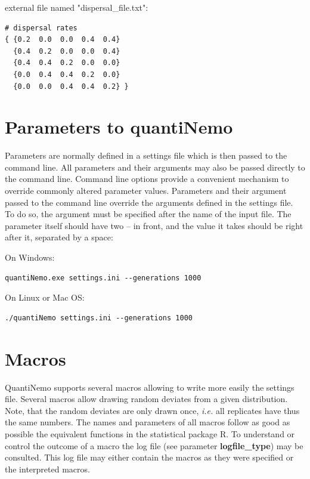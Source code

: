 \documentclass[letterpaper,12pt,oneside]{book}
\begin{document}
external file named "dispersal\_file.txt":
\begin{lstlisting}[frame=single]
# dispersal rates
{ {0.2  0.0  0.0  0.4  0.4}
  {0.4  0.2  0.0  0.0  0.4}
  {0.4  0.4  0.2  0.0  0.0}
  {0.0  0.4  0.4  0.2  0.0}
  {0.0  0.0  0.4  0.4  0.2} }
\end{lstlisting}

\section{Parameters to quantiNemo}\label{paramInput}
Parameters are normally defined in a settings file which is then passed to the command line. All parameters and their arguments may also be passed directly to the command line. Command line options provide a convenient mechanism to override commonly altered parameter values. Parameters and their argument passed to the command line override the arguments defined in the settings file. To do so, the argument must be specified after the name of the input file. The parameter itself should have two -- in front, and the value it takes should be right after it, separated by a space:   

On Windows:
\begin{lstlisting}[frame=single]
quantiNemo.exe settings.ini --generations 1000
\end{lstlisting}

On Linux or Mac OS:
\begin{lstlisting}[frame=single]
./quantiNemo settings.ini --generations 1000
\end{lstlisting}

\section{Macros}\label{macros}
QuantiNemo supports several macros allowing to write more easily the settings file. Several macros allow drawing random deviates from a given distribution. Note, that the random deviates are only drawn once, \textit{i.e.} all replicates have thus the same numbers. The names and parameters of all macros follow as good as possible the equivalent functions in the statistical package R. To understand or control the outcome of a macro the log file (see parameter \textbf{logfile\_type}) may be consulted. This log file may either contain the macros as they were specified or the interpreted macros.
\end{document}
